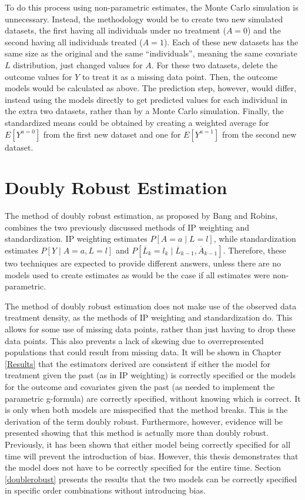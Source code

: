 To do this process using non-parametric estimates, the Monte Carlo simulation is unnecessary.  Instead, the methodology would be to create two new simulated datasets, the first having all individuals under no treatment ($A=0$) and the second having all individuals treated ($A=1$).  Each of these new datasets has the same size as the original and the same ``individuals'', meaning the same covariate $L$ distribution, just changed values for $A$.  For these two datasets, delete the outcome values for $Y$ to treat it as a missing data point.  Then, the outcome models would be calculated as above.  The prediction step, however, would differ, instead using the models directly to get predicted values for each individual in the extra two datasets, rather than by a Monte Carlo simulation.  Finally, the standardized means could be obtained by creating a weighted average for $E[Y^{a=0}]$ from the first new dataset and one for $E[Y^{a=1}]$ from the second new dataset.  

\section{Doubly Robust Estimation} 
The method of doubly robust estimation, as proposed by Bang and Robins,\cite{bang2005doubly} combines the two previously discussed methods of IP weighting and standardization.  IP weighting estimates $P[A=a \mid L =l]$, while standardization estimates $P[Y \mid A = a, L=l]$ and $P[\overline{L}_k =l_k \mid \overline{L}_{k-1}, \overline{A}_{k-1}]$.  Therefore, these two techniques are expected to provide different answers, unless there are no models used to create estimates as would be the case if all estimates were non-parametric.  \cite{hernan_robins_2016}   

The method of doubly robust estimation does not make use of the observed data treatment density, as the methods of IP weighting and standardization do. This allows for some use of missing data points, rather than just having to drop these data points.  This also prevents a lack of skewing due to overrepresented populations that could result from missing data.  It will be shown in Chapter \ref{Results} that the estimators derived are consistent if either the model for treatment given the past (as in IP weighting) is correctly specified or the models for the outcome and covariates given the past (as needed to implement the parametric g-formula) are correctly specified, without knowing which is correct.  It is only when both models are misspecified that the method breaks.  This is the derivation of the term doubly robust.  Furthermore, however, evidence will be presented showing that this method is actually more than doubly robust.  Previously, it has been shown that either model being correctly specified for all time will prevent the introduction of bias.  However, this thesis demonstrates that the model does not have to be correctly specified for the entire time. Section \ref{doublerobust} presents the results that the two models can be correctly specified in specific order combinations without introducing bias.  

